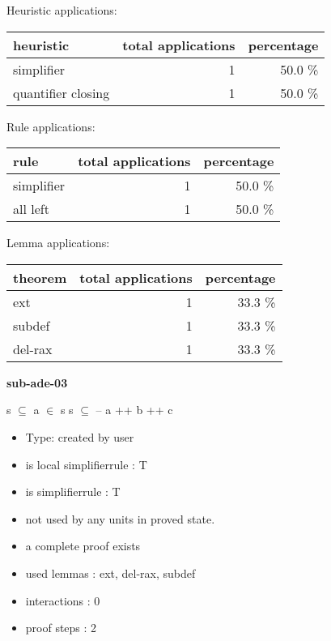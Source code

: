 \documentclass[a4paper]{article}
\begin{document}
\medskip


Heuristic applications:

\begin{supertabular}{l|r|r}
heuristic	& total applications & percentage \\ \hline
simplifier & 1 & 50.0 \% \\
quantifier closing & 1 & 50.0 \% \\

\end{supertabular}

Rule applications:

\begin{supertabular}{l|r|r}
rule	        & total applications & percentage \\ \hline
simplifier & 1 & 50.0 \% \\
all left & 1 & 50.0 \% \\

\end{supertabular}

Lemma applications:

\begin{supertabular}{l|r|r}
theorem	        & total applications & percentage \\ \hline
ext & 1 & 33.3 \% \\
subdef & 1 & 33.3 \% \\
del-rax & 1 & 33.3 \% \\

\end{supertabular}
\pagebreak

{\LARGE\bf sub-ade-03}\label{lemma-sub-ade-03}

\medskip

 \Fol s $\subseteq$  \And \Not a $\in$ s \Imp s $\subseteq$  -- a ++ b ++ c

\begin{itemize}

\item Type: created by user

\item is local simplifierrule : T
\item is simplifierrule : T
\item not used by any units in proved state.
\item       a complete proof exists
\item       used lemmas  : ext, del-rax, subdef
\item       interactions : 0
\item       proof steps  : 2
\end{itemize}
\end{document}
